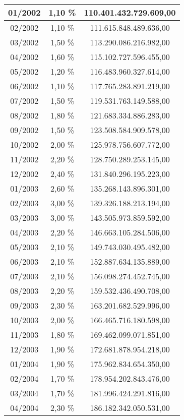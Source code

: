 \begin{center}
\begin{longtable}{|c|c|c|}
01/2002 & 1,10 \% & 110.401.432.729.609,00 \\ \hline
02/2002 & 1,10 \% & 111.615.848.489.636,00 \\ \hline
03/2002 & 1,50 \% & 113.290.086.216.982,00 \\ \hline
04/2002 & 1,60 \% & 115.102.727.596.455,00 \\ \hline
05/2002 & 1,20 \% & 116.483.960.327.614,00 \\ \hline
06/2002 & 1,10 \% & 117.765.283.891.219,00 \\ \hline
07/2002 & 1,50 \% & 119.531.763.149.588,00 \\ \hline
08/2002 & 1,80 \% & 121.683.334.886.283,00 \\ \hline
09/2002 & 1,50 \% & 123.508.584.909.578,00 \\ \hline
10/2002 & 2,00 \% & 125.978.756.607.772,00 \\ \hline
11/2002 & 2,20 \% & 128.750.289.253.145,00 \\ \hline
12/2002 & 2,40 \% & 131.840.296.195.223,00 \\ \hline
01/2003 & 2,60 \% & 135.268.143.896.301,00 \\ \hline
02/2003 & 3,00 \% & 139.326.188.213.194,00 \\ \hline
03/2003 & 3,00 \% & 143.505.973.859.592,00 \\ \hline
04/2003 & 2,20 \% & 146.663.105.284.506,00 \\ \hline
05/2003 & 2,10 \% & 149.743.030.495.482,00 \\ \hline
06/2003 & 2,10 \% & 152.887.634.135.889,00 \\ \hline
07/2003 & 2,10 \% & 156.098.274.452.745,00 \\ \hline
08/2003 & 2,20 \% & 159.532.436.490.708,00 \\ \hline
09/2003 & 2,30 \% & 163.201.682.529.996,00 \\ \hline
10/2003 & 2,00 \% & 166.465.716.180.598,00 \\ \hline
11/2003 & 1,80 \% & 169.462.099.071.851,00 \\ \hline
12/2003 & 1,90 \% & 172.681.878.954.218,00 \\ \hline
01/2004 & 1,90 \% & 175.962.834.654.350,00 \\ \hline
02/2004 & 1,70 \% & 178.954.202.843.476,00 \\ \hline
03/2004 & 1,70 \% & 181.996.424.291.816,00 \\ \hline
04/2004 & 2,30 \% & 186.182.342.050.531,00 \\ \hline

\end{longtable}
\end{center}
